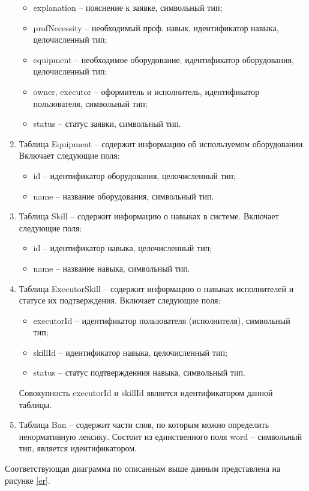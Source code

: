 \begin{enumerate}
\begin{itemize}
		\item explanation -- пояснение к заявке, символьный тип;
		\item profNecessity -- необходимый проф. навык, идентификатор навыка, целочисленный тип;
		\item equipment -- необходимое оборудование, идентификатор оборудования, целочисленный тип; 
		\item owner, executor -- оформитель и исполнитель, идентификатор пользователя, символьный тип;
		\item status -- статус заявки, символьный тип.
	\end{itemize}
	\item Таблица Equipment -- содержит информацию об используемом оборудовании. Включает следующие поля:
	\begin{itemize}
		\item id -- идентификатор оборудования, целочисленный тип;
		\item name -- название оборудования, символьный тип.
	\end{itemize}
	\item Таблица Skill -- содержит информацию о навыках в системе. Включает следующие поля:
	\begin{itemize}
		\item id -- идентификатор навыка, целочисленный тип;
		\item name -- название навыка, символьный тип.
	\end{itemize}
	\item Таблица ExecutorSkill -- содержит информацию о навыках исполнителей и статусе их подтверждения. Включает следующие поля:
	\begin{itemize}
		\item executorId -- идентификатор пользователя (исполнителя), символьный тип;
		\item skillId -- идентификатор навыка, целочисленный тип;
		\item status -- статус подтвержденния навыка, символьный тип.
	\end{itemize}
	Совокупность executorId и skillId является идентификатором данной таблицы.
	\item Таблица Ban -- содержит части слов, по которым можно определить ненормативную лексику. Состоит из единственного поля word -- символьный тип, является идентификатором.
\end{enumerate}
Соответствующая диаграмма по описанным выше данным представлена на рисунке \ref{er}.

